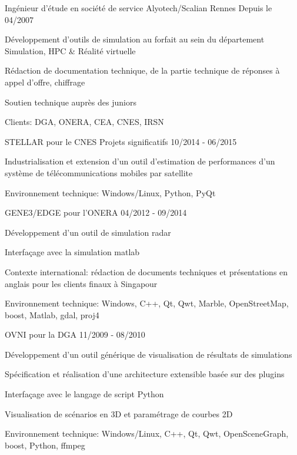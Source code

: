 \begin{cventries}
  \cventry
    {Ingénieur d'étude en société de service}
    {Alyotech/Scalian}
    {Rennes}
    {Depuis le 04/2007}
    {
      \begin{cvitems}
        \item {Développement d'outils de simulation au forfait au sein du département Simulation, HPC \& Réalité virtuelle }
        \item {Rédaction de documentation technique, de la partie technique de réponses à appel d'offre, chiffrage}
        \item {Soutien technique auprès des juniors}
        \item {Clients: DGA, ONERA, CEA, CNES, IRSN}
      \end{cvitems}
    }

  \cventry
    {STELLAR pour le CNES}
    {Projets significatifs}
    {}
    {10/2014 - 06/2015}
    {
      \begin{cvitems}
        \item {Industrialisation et extension d’un outil d’estimation de performances d’un 
			   système de télécommunications mobiles par satellite}
        \item {Environnement technique: Windows/Linux, Python, PyQt}
      \end{cvitems}
    }

  \cventry
    {GENE3/EDGE pour l'ONERA}
    {}
    {}
    {04/2012 - 09/2014}
    {
      \begin{cvitems}
        \item {Développement d’un outil de simulation radar}
        \item {Interfaçage avec la simulation matlab}
		\item {Contexte international: rédaction de documents techniques et 
	  		   présentations en anglais pour les clients finaux à Singapour}
		\item {Environnement technique: Windows, C++, Qt, Qwt, Marble, OpenStreetMap, 
	  		   boost, Matlab, gdal, proj4}
      \end{cvitems}
    }

  \cventry
    {OVNI pour la DGA}
    {}
    {}
    {11/2009 - 08/2010}
    {
      \begin{cvitems}
        \item {Développement d'un outil générique de visualisation de résultats de simulations}
        \item {Spécification et réalisation d'une architecture extensible basée sur des plugins}
        \item {Interfaçage avec le langage de script Python}
        \item {Visualisation de scénarios en 3D et paramétrage de courbes 2D}
		\item {Environnement technique: Windows/Linux, C++, Qt, Qwt, OpenSceneGraph, 
			boost, Python, ffmpeg}
      \end{cvitems}
    }


\end{cventries}
